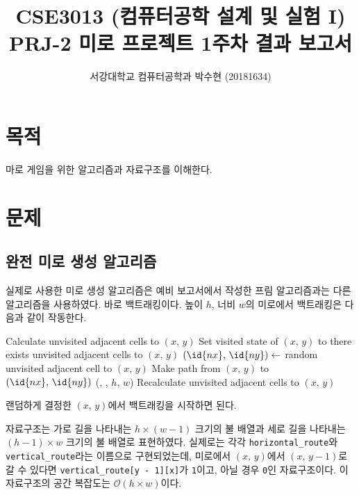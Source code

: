 
	


\title{CSE3013 (컴퓨터공학 설계 및 실험 I) \space \newline PRJ-2 미로 프로젝트 1주차 결과 보고서}
\author{서강대학교 컴퓨터공학과 박수현 (20181634)}
\maketitle

\section{목적}
마로 게임을 위한 알고리즘과 자료구조를 이해한다.

\section{문제}
\subsection{완전 미로 생성 알고리즘}

실제로 사용한 미로 생성 알고리즘은 예비 보고서에서 작성한 프림 알고리즘과는 다른 알고리즘을 사용하였다. 바로 백트래킹이다.
높이 $h$, 너비 $w$의 미로에서 백트래킹은 다음과 같이 작동한다.

\begin{codebox}
\li Calculate unvisited adjacent cells to $(x,\,y)$
\li Set visited state of $(x,\,y)$ to 
\li \While there exists unvisited adjacent cells to $(x,\,y)$ \Do
\li     $(\id{nx},\,\id{ny}) \gets$ random unvisited adjacent cell to $(x,\,y)$
\li     Make path from $(x,\,y)$ to $(\id{nx},\,\id{ny})$
\li     {}(, , $h$, $w$)
\li     Recalculate unvisited adjacent cells to $(x,\,y)$
    \End
\end{codebox}

랜덤하게 결정한 $(x,\,y)$에서 백트래킹을 시작하면 된다.

자료구조는 가로 길을 나타내는 $h \times \left(w - 1\right)$ 크기의 불 배열과 세로 길을 나타내는 $\left(h - 1\right) \times w$ 크기의
불 배열로 표현하였다. 실제로는 각각 \texttt{horizontal_route}와 \texttt{vertical_route}라는 이름으로 구현되었는데,
미로에서 $(x,\,y)$에서 $(x,\,y-1)$로 갈 수 있다면 \texttt{vertical_route[y - 1][x]}가 \texttt{1}이고, 아닐 경우 \texttt{0}인 자료구조이다.
이 자료구조의 공간 복잡도는 $\mathcal{O}\left(h\times w\right)$이다.

